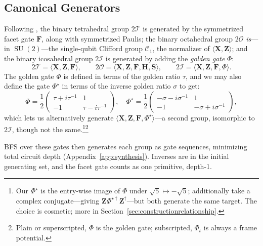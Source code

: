\documentclass[11pt, oneside, openany]{scrbook}
\DeclareMathOperator{\SU}{SU}
\newcommand{\Tgroup}{\mathcal{T}}  %
\newcommand{\Ogroup}{\mathcal{O}}  %
\newcommand{\Igroup}{\mathcal{I}}  %
\newcommand{\TwoT}{2\Tgroup}
\newcommand{\TwoO}{2\Ogroup}
\newcommand{\TwoI}{2\Igroup}
\newcommand{\phig}{\tau} %
\newcommand{\invphig}{\sigma} %
\begin{document}
\subsection{Canonical Generators} \label{sec:canonicalgenerators}
Following \textcite{kubischta2023familyquantumcodes}, the binary tetrahedral group $\TwoT$ is generated by the symmetrized facet gate $\mathbf{F}$, along with symmetrized Paulis; the binary octahedral group $\TwoO$ \textit{is}---in $\SU(2)$---the single-qubit Clifford group $\mathcal{C}_1$, the normalizer of $\langle \mathbf{X}, \mathbf{Z} \rangle$; and the binary icosahedral group $\TwoI$ is generated by adding the \textit{golden gate} $\Phi$:
$$ \TwoT = \langle \mathbf{X}, \mathbf{Z}, \mathbf{F} \rangle, \qquad \TwoO = \langle \mathbf{X}, \mathbf{Z}, \mathbf{F}, \mathbf{H}, \mathbf{S} \rangle, \qquad \TwoI = \langle \mathbf{X}, \mathbf{Z}, \mathbf{F}, \Phi \rangle. $$
The golden gate $\Phi$ is defined in terms of the golden ratio $\phig$, and we may also define the gate $\Phi^\star$ in terms of the inverse golden ratio $\invphig$ to get:
\begin{equation}\label{eq:golden-gate}
    \Phi = \frac{1}{2} \begin{pmatrix} \phig + i\phig^{-1} & 1 \\ -1 & \phig - i\phig^{-1} \end{pmatrix}, \quad \Phi^\star = \frac{1}{2} \begin{pmatrix} -\invphig - i\invphig^{-1} & 1 \\ -1 & -\invphig + i\invphig^{-1} \end{pmatrix},
\end{equation}
which lets us alternatively generate $\langle \mathbf{X}, \mathbf{Z}, \mathbf{F}, \Phi^\star \rangle$---a second group, isomorphic to $\TwoI$, though not the same.\footnote{Our $\Phi^\star$ is the entry-wise image of $\Phi$ under $\sqrt{5} \mapsto -\sqrt{5}$; \textcite{kubischta2023familyquantumcodes} additionally take a complex conjugate---giving $\mathbf{Z} \Phi^{\star\dagger} \mathbf{Z}^\dagger$---but both generate the same target. The choice is cosmetic; more in Section~\ref{sec:constructionrelationship}.}\footnote{Plain or superscripted, $\Phi$ is the golden gate; subscripted, $\Phi_t$ is always a frame potential.}

BFS over these gates then generates each group as gate sequences, minimizing total circuit depth (Appendix~\ref{app:synthesis}). Inverses are in the initial generating set, and the facet gate counts as one primitive, depth-1.
\end{document}
